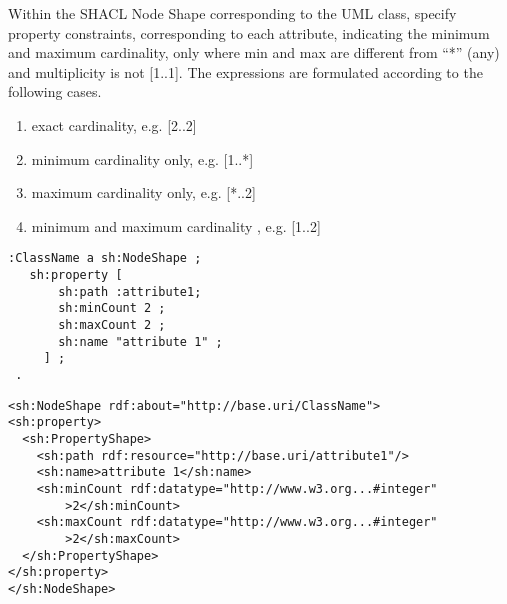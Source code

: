 \begin{trule}
	\label{rule:attribute-ds-multiplicity}
	Within the SHACL Node Shape corresponding to the UML class, specify property constraints, corresponding to each attribute, indicating the minimum and maximum cardinality, only where min and max are different from ``*'' (any) and multiplicity is not [1..1]. The expressions are formulated according to the following cases.	
	\begin{enumerate}[label=\Alph*.]
		\item exact cardinality, e.g. [2..2]
		\item minimum cardinality only, e.g. [1..*]
		\item maximum cardinality only, e.g. [*..2]
		\item minimum and maximum cardinality , e.g. [1..2]
	\end{enumerate}
\end{trule}

\vspace{-\parskip}
\begin{minipage}[b]{.385\textwidth}
\begin{lstlisting}[language=Turtle, caption={Exact cardinality constraint in  Turtle syntax}, captionpos=b]
 :ClassName a sh:NodeShape ;
   sh:property [
       sh:path :attribute1;
       sh:minCount 2 ;
       sh:maxCount 2 ;
       sh:name "attribute 1" ;
     ] ;
 .
\end{lstlisting}
\end{minipage}%
\quad\vspace{-\parskip}
\begin{minipage}[b]{.6\textwidth}
\begin{lstlisting}[language=RDF/XML, caption={Exact cardinality constraint in RDF/XML syntax}, captionpos=b]
<sh:NodeShape rdf:about="http://base.uri/ClassName">
<sh:property>
  <sh:PropertyShape>
    <sh:path rdf:resource="http://base.uri/attribute1"/>
    <sh:name>attribute 1</sh:name>
    <sh:minCount rdf:datatype="http://www.w3.org...#integer"
        >2</sh:minCount>
    <sh:maxCount rdf:datatype="http://www.w3.org...#integer"
        >2</sh:maxCount>        
  </sh:PropertyShape>
</sh:property>
</sh:NodeShape>
\end{lstlisting}
\end{minipage}
\vspace{-\parskip}

